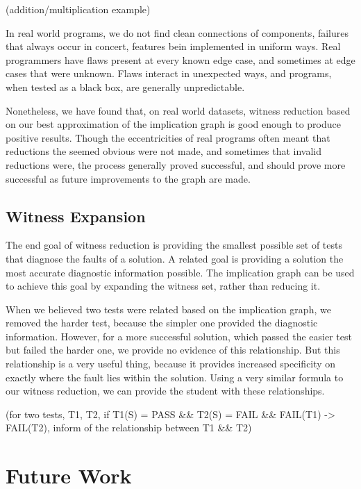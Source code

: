 \documentclass[11pt]{article}
\begin{document}
(addition/multiplication example)

In real world programs, we do not find clean connections of components, failures that always occur in concert, features bein implemented in uniform ways. Real programmers have flaws present at every known edge case, and sometimes at edge cases that were unknown. Flaws interact in unexpected ways, and programs, when tested as a black box, are generally unpredictable.

Nonetheless, we have found that, on real world datasets, witness reduction based on our best approximation of the implication graph is good enough to produce positive results. Though the eccentricities of real programs often meant that reductions the seemed obvious were not made, and sometimes that invalid reductions were, the process generally proved successful, and should prove more successful as future improvements to the graph are made.

\subsection*{Witness Expansion}

The end goal of witness reduction is providing the smallest possible set of tests that diagnose the faults of a solution. A related goal is providing a solution the most accurate diagnostic information possible. The implication graph can be used to achieve this goal by expanding the witness set, rather than reducing it.

When we believed two tests were related based on the implication graph, we removed the harder test, because the simpler one provided the diagnostic information. However, for a more successful solution, which passed the easier test but failed the harder one, we provide no evidence of this relationship. But this relationship is a very useful thing, because it provides increased specificity on exactly where the fault lies within the solution. Using a very similar formula to our witness reduction, we can provide the student with these relationships.

(for two tests, T1, T2, if T1(S) = PASS \&\& T2(S) = FAIL \&\& FAIL(T1) -> FAIL(T2), inform of the relationship between T1 \&\& T2)





\section{Future Work}
\end{document}
